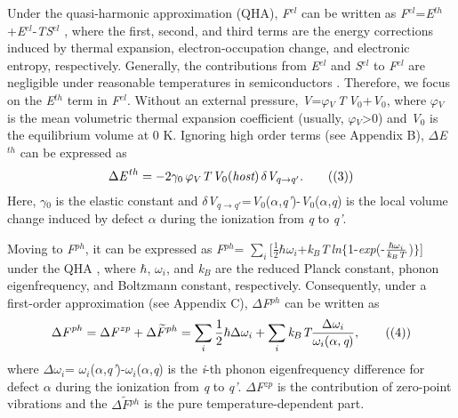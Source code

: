\documentclass[onecolumn,preprint,superscriptaddress]{revtex4-1}
\begin{document}
Under the quasi-harmonic approximation (QHA), \emph{F}$^{el}$ can be written as \emph{F}$^{el}$=\emph{E}$^{th}$+\emph{E}$^{el}$-\emph{T}\emph{S}$^{el}$ \cite{13,29,30}, where the first, second, and third terms are the energy corrections induced by thermal expansion, electron-occupation change, and electronic entropy, respectively. Generally, the contributions from \emph{E}$^{el}$ and \emph{S}$^{el}$ to \emph{F}$^{el}$ are negligible under reasonable temperatures in semiconductors \cite{12,31}. Therefore, we focus on the \emph{E}$^{th}$ term in \emph{F}$^{el}$. Without an external pressure, \emph{V}=$\varphi$$_{V}$$\,$\emph{T}$\,$\emph{V}$_{0}$+\emph{V}$_{0}$, where $\varphi$$_{V}$ is the mean volumetric thermal expansion coefficient (usually, $\varphi$$_{V}$>0) and \emph{V}$_{0}$ is the equilibrium volume at 0 K. Ignoring high order terms (see Appendix B), $\Delta$\emph{E}$^{th}$ can be expressed as
\begin{equation}
\Delta\emph{E}^{\,th}
=-2\gamma_0\,\varphi_{V}\emph{T}\,\emph{V}_{0}(\emph{host})\,\delta\emph{V}_{q\rightarrow q'}.   \tag{(3)}
\end{equation}
\noindent Here, $\gamma$$_0$ is the elastic constant and $\delta$\emph{V}$_{q\rightarrow q'}$=\emph{V}$_{0}$($\alpha$,\emph{q'})-\emph{V}$_{0}$($\alpha$,\emph{q}) is the local volume change induced by defect $\alpha$ during the ionization from \emph{q} to \emph{q'}.

Moving to \emph{F}$^{ph}$, it can be expressed as \emph{F}$^{ph}$= $\sum_{i}$[$\frac{1}{2}$$\hbar$$\omega$$_{i}$+\emph{k}$_{B}$\emph{T}$\,$\emph{ln}$\lbrace$1-\emph{exp}(-$\frac{\hbar \omega _i}{\emph{k}_B\emph{T}}$)$\rbrace$] under the QHA \cite{32}, where $\hbar$, $\omega$$_{i}$, and \emph{k}$_{B}$ are the reduced Planck constant, phonon eigenfrequency, and Boltzmann constant, respectively. Consequently, under a first-order approximation (see Appendix C), $\Delta$\emph{F}$^{ph}$ can be written as
\begin{equation}
\Delta\emph{F}^{\,ph} =\Delta\emph{F}^{\,zp}+\Delta\widetilde{F}^{ph}
=\sum_{i}\frac{1}{2}\hbar\Delta\omega_{i}+\sum_{i}\emph{k}_{B}\emph{T}\frac{\Delta \omega _i}{\omega_i(\alpha,\emph{q})},   \tag{(4)}
\end{equation}
\noindent where $\Delta$$\omega$$_{i}$= $\omega$$_{i}$($\alpha$,\emph{q'})-$\omega$$_{i}$($\alpha$,\emph{q}) is the \emph{i}-th phonon eigenfrequency difference for defect $\alpha$ during the ionization from \emph{q} to \emph{q'}. $\Delta$\emph{F}$^{zp}$ is the contribution of zero-point vibrations and the $\Delta$$\widetilde{F}$$^{ph}$ is the pure temperature-dependent part.
\end{document}
